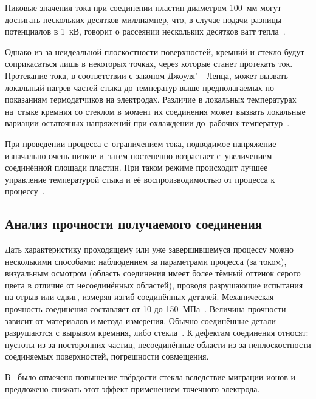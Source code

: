 Пиковые значения тока при соединении пластин диаметром 100~мм могут достигать нескольких десятков миллиампер, что, в случае подачи разницы потенциалов в 1~кВ, говорит о рассеянии нескольких десятков ватт тепла~\cite{Rogers_current_limited_AB_2005}.

Однако из-за неидеальной плоскостности поверхностей, кремний и стекло будут соприкасаться лишь в некоторых точках, через которые станет протекать ток. Протекание тока, в соответствии с законом Джоуля"--~Ленца, может вызвать локальный нагрев частей стыка до температур выше предполагаемых по показаниям термодатчиков на электродах. Различие в локальных температурах на~стыке кремния со стеклом в момент их соединения может вызвать локальные вариации остаточных напряжений при охлаждении до~рабочих температур~\cite{Rogers_current_limited_AB_2005}.

При проведении процесса с~ограничением тока, подводимое напряжение
изначально очень низкое и~затем постепенно возрастает с~увеличением
соединённой площади пластин. При таком режиме происходит лучшее
управление температурой стыка и её воспроизводимостью от процесса к
процессу~\cite{Rogers_current_limited_AB_2005}.

\subsection{Анализ прочности получаемого соединения}
Дать характеристику проходящему или уже завершившемуся процессу можно
несколькими способами: наблюдением за параметрами процесса (за током),
визуальным осмотром (область соединения имеет более тёмный оттенок
серого цвета в отличие от несоединённых областей), проводя разрушающие
испытания на отрыв или сдвиг, измеряя изгиб соединённых деталей.
Механическая прочность соединения составляет от 10 до
150~МПа~\cite{guan2006icept06,
Hu2008tensile_tests,
Villanueva2006_Transfer_small}. Величина прочности зависит от
материалов и метода измерения. Обычно соединённые детали разрушаются с
вырывом кремния, либо стекла~\cite{Khomenko1982useglassproperties}. К
дефектам соединения относят: пустоты из-за посторонних частиц,
несоединённые области из-за неплоскостности соединяемых поверхностей,
погрешности совмещения.

В~\cite{Cozma_Puers_1995} было отмечено повышение твёрдости стекла вследствие миграции ионов и предложено снижать этот эффект применением точечного электрода.

